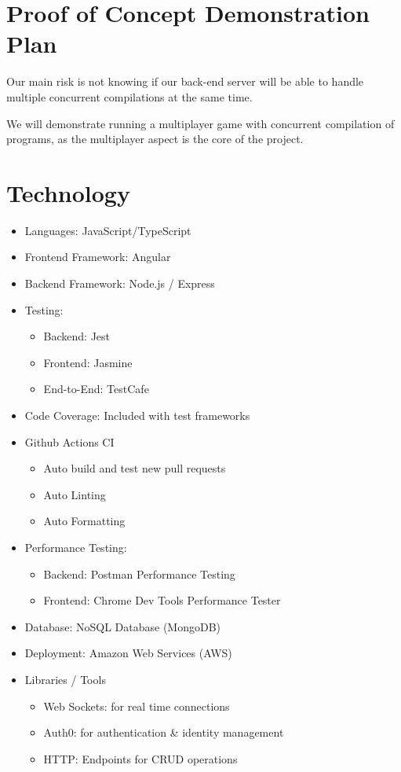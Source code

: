\documentclass{article}
\begin{document}
\section{Proof of Concept Demonstration Plan}


Our main risk is not knowing if our back-end server will be able to handle multiple concurrent compilations at the same time.

We will demonstrate running a multiplayer game with concurrent compilation of programs, as the multiplayer aspect is the core of the project.

\section{Technology}

\begin{itemize}
\item Languages: JavaScript/TypeScript
\item Frontend Framework: Angular
\item Backend Framework: Node.js / Express
\item Testing:
   \begin{itemize}
       \item Backend: Jest
       \item Frontend: Jasmine
       \item End-to-End: TestCafe
   \end{itemize}
\item Code Coverage: Included with test frameworks
\item Github Actions CI 
    \begin{itemize}
        \item Auto build and test new pull requests
        \item Auto Linting
        \item Auto Formatting
    \end{itemize}
\item Performance Testing: 
    \begin{itemize}
       \item Backend: Postman Performance Testing
       \item Frontend: Chrome Dev Tools Performance Tester
   \end{itemize}
\item Database: NoSQL Database (MongoDB)
\item Deployment: Amazon Web Services (AWS)
\item Libraries / Tools
\begin{itemize}
    \item Web Sockets: for real time connections
    \item Auth0: for authentication \& identity management
    \item HTTP: Endpoints for CRUD operations
\end{itemize}
\end{itemize}
\end{document}
